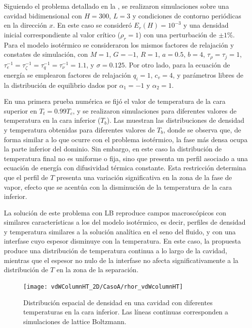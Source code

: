 Siguiendo el problema detallado en la , se realizaron simulaciones sobre  una cavidad bidimensional con $H=300$, $L=3$ y condiciones de contorno peri\'odicas en la direcci\'on $x$. En este caso se consider\'o $E_r(H)=10^{-3}$ y una densidad inicial correspondiente al valor cr\'itico ($\rho_r = 1$) con una perturbaci\'on de $\pm 1 \%$.  Para el modelo isot\'ermico se consideraron los mismos factores de relajaci\'on y constates de simulaci\'on, con $M=1$, $G=-1$, $R=1$, $a=0.5$, $b=4$, $\tau_{\rho} = \tau_j=1$, $\tau_{e}^{-1}=\tau_{\zeta}^{-1}=\tau_{q}^{-1}=\tau_{\nu}^{-1}=1.1$, y $\sigma = 0.125$. Por otro lado, para la ecuaci\'on de energ\'ia se emplearon factores de relajaci\'on $q_i = 1$, $c_v = 4$, y par\'ametros libres de la distribuci\'on de equilibrio dados por $\alpha_1 = -1$ y $\alpha_2 = 1$. 

En una primera prueba num\'erica se fij\'o el valor de temperatura de la cara superior en $T_t = 0.99 T_c$, y se realizaron simulaciones para diferentes valores de temperatura en la cara inferior ($T_b$). Las  muestran las distribuciones de densidad y temperatura obtenidas para diferentes valores de $T_b$, donde se observa que, de forma similar a lo que ocurre con el problema isot\'ermico, la fase m\'as densa ocupa la parte inferior del dominio. Sin embargo, en este caso la distribuci\'on de temperatura final no es uniforme o fija, sino que presenta un perfil asociado a una ecuaci\'on de energ\'ia con difusividad t\'ermica constante. Esta restricci\'on determina que el perfil de $T$ presenta una variaci\'on significativa en la zona de la fase de vapor, efecto que se acent\'ua con la disminuci\'on de la temperatura de la cara inferior.

La soluci\'on de este problema con LB reproduce campos macrosc\'opicos con similares caracter\'isticas a los del modelo isot\'ermico, es decir, perfiles de densidad y temperatura similares a la soluci\'on anal\'itica en el seno del fluido, y con una interfase cuyo espesor disminuye con la temperatura. En este caso, la \lbe{} propuesta produce una distribuci\'on de temperatura continua a lo largo de la cavidad, mientras que el espesor no nulo de la interfase no afecta significativamente a la distribuci\'on de $T$ en la zona de la separaci\'on.

\begin{figure}[ht]
	\centering
	\texttt{[image: vdWColumnHT\_2D/CasoA/rhor\_vdWcolumnHT]}
	\caption{Distribuci\'on espacial de densidad en una cavidad con diferentes temperaturas en la cara inferior. Las l\'ineas continuas corresponden a simulaciones de lattice Boltzmann.}
	\label{fig:vdWColumnHT_rhor}
\end{figure}

